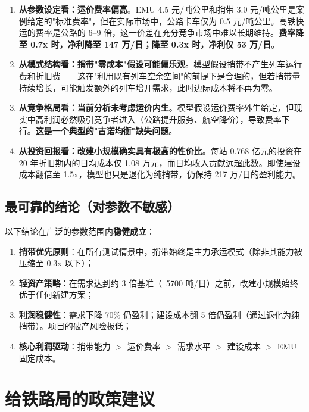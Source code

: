 \documentclass[12pt,a4paper,fontset=none]{ctexart}
\begin{document}
\begin{enumerate}[leftmargin=*]

\item \textbf{从参数设定看：运价费率偏高}。EMU 4.5 元/吨公里和捎带 3.0 元/吨公里是案例给定的"标准费率"，但在实际市场中，公路卡车仅为 0.5 元/吨公里。高铁快运的费率是公路的 6--9 倍，这一价差在充分竞争市场中难以长期维持。\textbf{费率降至 0.7x 时，净利降至 147 万/日；降至 0.3x 时，净利仅 53 万/日}。

\item \textbf{从模式结构看：捎带"零成本"假设可能偏乐观}。模型假设捎带不产生列车运行费和折旧费——这在"利用既有列车空余空间"的前提下是合理的，但若捎带量持续增长，可能触发额外的列车增开需求，此时边际成本将不再为零。

\item \textbf{从竞争格局看：当前分析未考虑运价内生}。模型假设运价费率外生给定，但现实中高利润必然吸引竞争者进入（公路提升服务、航空降价），导致费率下行。\textbf{这是一个典型的"古诺均衡"缺失问题}。

\item \textbf{从投资回报看：改建小规模确实具有极高的性价比}。每站 0.768 亿元的投资在 20 年折旧期内的日均成本仅 1.08 万元，而日均收入贡献远超此数。即使建设成本翻倍至 1.5x，模型也只是退化为纯捎带，仍保持 217 万/日的盈利能力。

\end{enumerate}

\subsection{最可靠的结论（对参数不敏感）}

以下结论在广泛的参数范围内\textbf{稳健成立}：

\begin{enumerate}[leftmargin=*]
    \item \textbf{捎带优先原则}：在所有测试情景中，捎带始终是主力承运模式（除非其能力被压缩至 0.3x 以下）；
    \item \textbf{轻资产策略}：在需求达到约 3 倍基准（~5700 吨/日）之前，改建小规模始终优于任何新建方案；
    \item \textbf{利润稳健性}：需求下降 70\% 仍盈利；建设成本翻 5 倍仍盈利（通过退化为纯捎带）。项目的破产风险极低；
    \item \textbf{核心利润驱动}：捎带能力 $>$ 运价费率 $>$ 需求水平 $>$ 建设成本 $>$ EMU 固定成本。
\end{enumerate}

\section{给铁路局的政策建议}
\end{document}
